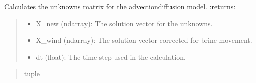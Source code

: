 \documentclass[a4paper,11pt,english,openany]{sphinxmanual}
\begin{document}
\begin{fulllineitems}
\begin{fulllineitems}
\begin{quote}
\begin{description}
\end{description}\end{quote}

\end{fulllineitems}


\begin{fulllineitems}
\label{\detokenize{api/spyice.models.advection_diffusion:spyice.models.advection_diffusion.AdvectionDiffusion.unknowns_matrix}}
\pysigstartsignatures
{}
\pysigstopsignatures
\sphinxAtStartPar
Calculates the unknowns matrix for the advection\sphinxhyphen{}diffusion model.
:returns:
\begin{quote}
\begin{description}
\begin{itemize}
\item {} 
\sphinxAtStartPar
X\_new (ndarray): The solution vector for the unknowns.

\item {} 
\sphinxAtStartPar
X\_wind (ndarray): The solution vector corrected for brine movement.

\item {} 
\sphinxAtStartPar
dt (float): The time step used in the calculation.

\end{itemize}

\end{description}
\end{quote}
\begin{quote}\begin{description}
\sphinxAtStartPar
tuple

\end{description}\end{quote}

\end{fulllineitems}


\end{fulllineitems}

\end{document}

